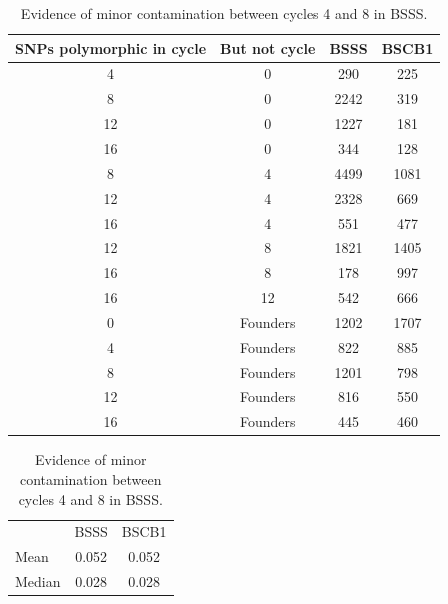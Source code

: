 \begin{table}
\caption{Evidence of minor contamination between cycles 4 and 8 in BSSS.}
\centering

\begin{tabular}{ cccc }
	{SNPs polymorphic in cycle} & {But not cycle} & {BSSS} & {BSCB1} \\ \hline
	4 & 0 & 290 & 225 \\ 
	8 & 0 & 2242 & 319 \\
	12 & 0 & 1227 & 181 \\ 
	16 & 0 & 344 & 128 \\ 
	8 & 4 & 4499 & 1081 \\ 
	12 & 4 & 2328 & 669 \\ 
	16 & 4 & 551 & 477 \\ 
	12 & 8 & 1821 & 1405 \\ 
	16 & 8 & 178 & 997 \\ 
	16 & 12 & 542 & 666 \\ 
	0 & Founders & 1202 & 1707 \\ 
	4 & Founders & 822 & 885 \\ 
	8 & Founders & 1201 & 798 \\ 
	12 & Founders & 816 & 550 \\ 
	16 & Founders & 445 & 460 \\ \hline
\end{tabular}
\bigskip
{}
\begin{tabular}{  lcc }
\multicolumn{1}{l}{} & \multicolumn{1}{l}{BSSS} & \multicolumn{1}{l}{BSCB1}   \\ \cline{2-3}
	Mean & 0.052 & 0.052   \\ 
	Median & 0.028 & 0.028   \\ 
\end{tabular}
		    \label{tab:contamination}  %
\end{table}